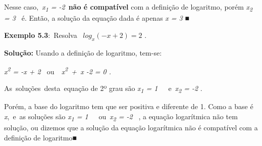 \documentclass[12pt]{article}
\begin{document}
\begin{enumerate}[label*={\fontsize{14pt}{14pt}\selectfont \textbf{\arabic*.}}]
\begin{adjustwidth}{0.49in}{0.0in}
\end{adjustwidth}

\begin{adjustwidth}{0.49in}{0.0in}
\begin{justify}
Nesse caso,\  \textit{x\textsubscript{1} = -2}\  \textbf{não é compatível} com a definição de logaritmo, porém \textit{x\textsubscript{2} = 3\  } é. Então, a solução da equação dada é apenas \textit{x = 3} ■\  \ \ \ \ \ \  \textit{\ \  }
\end{justify}\par

\end{adjustwidth}


\vspace{\baselineskip}
\begin{justify}
\textbf{Exemplo 5.3}:\ Resolva  \   \( log_{x} \left( -x+2 \right) =2 \) .
\end{justify}\par

\begin{justify}
\textbf{Solução: }Usando a definição de logaritmo, tem-se:
\end{justify}\par

\begin{adjustwidth}{0.49in}{0.0in}
\begin{justify}
\textit{x\textsuperscript{2} = -x + 2 \  }ou\ \  \textit{x\textsuperscript{2}\ +\ x -2 = 0   .}
\end{justify}\par

\end{adjustwidth}

\begin{justify}
As\ soluções\ desta\ equação de 2º grau são    \textit{x\textsubscript{1} = 1}\ \ \ e\   \textit{x\textsubscript{2} = -2} . 
\end{justify}\par

\begin{adjustwidth}{0.49in}{0.0in}
\begin{justify}
Porém, a base do logaritmo tem que ser positiva e diferente de 1. Como a base é \textit{x},\ e\ as soluções são   \textit{x\textsubscript{1} = 1}\ \ \ ou\   \textit{x\textsubscript{2} = -2} \  , a equação logarítmica não tem solução, ou dizemos que a solução da equação logarítmica não é compatível com a definição de logaritmo■
\end{justify}\par


\end{adjustwidth}
\end{enumerate}
\end{document}

